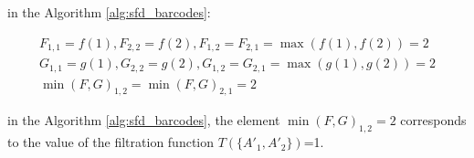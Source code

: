 \documentclass[runningheads]{llncs}
\begin{document}
in the Algorithm \ref{alg:sfd_barcodes}:

\begin{align*}
F_{1,1} = f(1), F_{2,2} = f(2), F_{1,2} = F_{2,1} = \max(f(1), f(2))= 2 \\ 
G_{1,1} = g(1), G_{2,2} = g(2), G_{1,2} = G_{2,1} = \max(g(1), g(2)) = 2 \\
\min(F,G)_{1,2} = \min(F,G)_{2,1} = 2
\end{align*}

in the Algorithm \ref{alg:sfd_barcodes}, the element $\min(F,G)_{1,2}=2$ corresponds to the value of the filtration function $T(\{A'_1, A'_2\})$=1.
\fi
\end{document}
